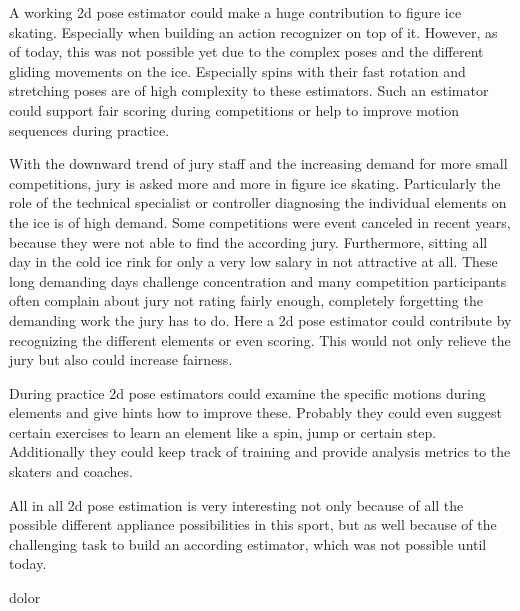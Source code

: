 \begin{flushleft}
    A working 2d pose estimator could make a huge contribution to figure ice skating.
    Especially when building an action recognizer on top of it.
    However, as of today, this was not possible yet due to the complex poses and the different gliding movements
    on the ice.
    Especially spins with their fast rotation and stretching poses are of high complexity to these estimators.
    Such an estimator could support fair scoring during competitions or help to improve motion sequences during
    practice.
\end{flushleft}
\begin{flushleft}
    With the downward trend of jury staff and the increasing demand for more small competitions, jury is asked
    more and more in figure ice skating.
    Particularly the role of the technical specialist or controller diagnosing the individual elements on the ice
    is of high demand.
    Some competitions were event canceled in recent years, because they were not able to find the according jury.
    Furthermore, sitting all day in the cold ice rink for only a very low salary in not attractive at all.
    These long demanding days challenge concentration and many competition participants often complain about jury
    not rating fairly enough,
    completely forgetting the demanding work the jury has to do.
    Here a 2d pose estimator could contribute by recognizing the different elements or even scoring.
    This would not only relieve the jury but also could increase fairness.
\end{flushleft}
\begin{flushleft}
    During practice 2d pose estimators could examine the specific motions during elements and give hints how to
    improve these.
    Probably they could even suggest certain exercises to learn an element like a spin, jump or certain step.
    Additionally they could keep track of training and provide analysis metrics to the skaters and coaches.
\end{flushleft}
\begin{flushleft}
    All in all 2d pose estimation is very interesting not only because of all the possible different appliance
    possibilities in this sport,
    but as well because of the
    challenging task to build an according estimator, which was not possible until today.
\end{flushleft}
dolor


